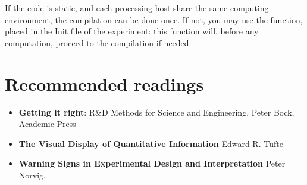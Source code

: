 \documentclass[a4paper,fleqn]{tufte-handout}
\begin{document}
If the code is static, and each processing host share the same computing environment, the compilation can be done once. If not, you may use the  function, placed in the Init file of the experiment: this function will, before any computation, proceed to the compilation if needed.

%
%
%
%
%
%
%
%
%
%
%
%
%

\section{Recommended readings}
\hypertarget{readings}{}
 
\begin{itemize}

\item \textbf{Getting it right}: R\&D Methods for Science and Engineering, Peter Bock, Academic Press

\item \textbf{The Visual Display of Quantitative Information} Edward R. Tufte

\item \textbf{Warning Signs in Experimental Design and Interpretation} Peter Norvig.

\end{itemize}


\end{document}
